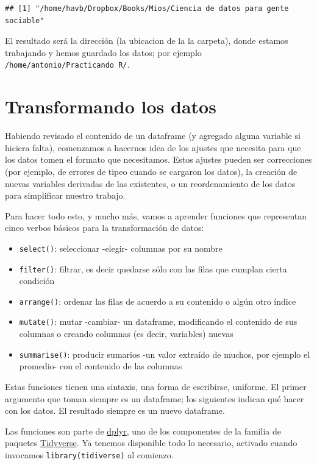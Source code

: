 \documentclass[spanish,]{book}
\providecommand{\tightlist}{%
  \setlength{\itemsep}{0pt}\setlength{\parskip}{0pt}}
\begin{document}
\begin{verbatim}
## [1] "/home/havb/Dropbox/Books/Mios/Ciencia de datos para gente sociable"
\end{verbatim}

El resultado será la dirección (la ubicacion de la la carpeta), donde estamos trabajando y hemos guardado los datos; por ejemplo \texttt{/home/antonio/Practicando\ R/}.

\hypertarget{transformando-los-datos}{%
\section{Transformando los datos}\label{transformando-los-datos}}

Habiendo revisado el contenido de un dataframe (y agregado alguna variable si hiciera falta), comenzamos a hacernos idea de los ajustes que necesita para que los datos tomen el formato que necesitamos. Estos ajustes pueden ser correcciones (por ejemplo, de errores de tipeo cuando se cargaron los datos), la creación de nuevas variables derivadas de las existentes, o un reordenamiento de los datos para simplificar nuestro trabajo.

Para hacer todo esto, y mucho más, vamos a aprender funciones que representan cinco verbos básicos para la transformación de datos:

\begin{itemize}
\tightlist
\item
  \texttt{select()}: seleccionar -elegir- columnas por su nombre
\item
  \texttt{filter()}: filtrar, es decir quedarse sólo con las filas que cumplan cierta condición
\item
  \texttt{arrange()}: ordenar las filas de acuerdo a su contenido o algún otro índice
\item
  \texttt{mutate()}: mutar -cambiar- un dataframe, modificando el contenido de sus columnas o creando columnas (es decir, variables) nuevas
\item
  \texttt{summarise()}: producir sumarios -un valor extraído de muchos, por ejemplo el promedio- con el contenido de las columnas
\end{itemize}

Estas funciones tienen una sintaxis, una forma de escribirse, uniforme. El primer argumento que toman siempre es un dataframe; los siguientes indican qué hacer con los datos. El resultado siempre es un nuevo dataframe.

Las funciones son parte de \href{http://dplyr.tidyverse.org/}{dplyr}, uno de los componentes de la familia de paquetes \href{https://www.tidyverse.org/}{Tidyverse}. Ya tenemos disponible todo lo necesario, activado cuando invocamos \texttt{library(tidiverse)} al comienzo.
\end{document}
